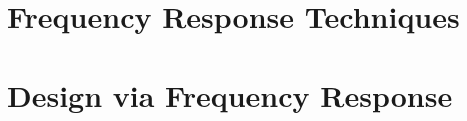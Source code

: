 \documentclass[11pt]{article}
\begin{document}
    \pagebreak


    \section{Frequency Response Techniques}

    \pagebreak


    \section{Design via Frequency Response}
    
    \pagebreak


    
\end{document}
